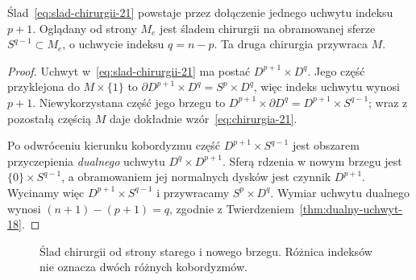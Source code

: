 \begin{twierdzenie}
\label{thm:odwrotna-chirurgia-21}
Ślad~\eqref{eq:slad-chirurgii-21} powstaje przez
dołączenie jednego uchwytu indeksu $p+1$.
Oglądany od strony $M_e$ jest śladem chirurgii
na obramowanej sferze $S^{q-1}\subset M_e$,
o uchwycie indeksu $q=n-p$.
Ta druga chirurgia przywraca $M$.
\end{twierdzenie}
\begin{proof}
Uchwyt w~\eqref{eq:slad-chirurgii-21} ma postać
$D^{p+1}\times D^q$. Jego część przyklejona do
$M\times\{1\}$ to $\partial D^{p+1}\times D^q
=S^p\times D^q$, więc indeks uchwytu wynosi $p+1$.
Niewykorzystana część jego brzegu to
$D^{p+1}\times\partial D^q=D^{p+1}\times S^{q-1}$;
wraz z pozostałą częścią $M$ daje dokładnie
wzór~\eqref{eq:chirurgia-21}.

Po odwróceniu kierunku kobordyzmu część
$D^{p+1}\times S^{q-1}$ jest obszarem
przyczepienia \emph{dualnego} uchwytu
$D^q\times D^{p+1}$. Sferą rdzenia w nowym
brzegu jest $\{0\}\times S^{q-1}$, a obramowaniem
jej normalnych dysków jest czynnik $D^{p+1}$.
Wycinamy więc $D^{p+1}\times S^{q-1}$
i przywracamy $S^p\times D^q$.
Wymiar uchwytu dualnego wynosi
$(n+1)-(p+1)=q$, zgodnie z
Twierdzeniem~\ref{thm:dualny-uchwyt-18}.
\end{proof}

\begin{figure}[htbp]
\centering
{}
\caption{Ślad chirurgii od strony starego i nowego brzegu.
Różnica indeksów nie oznacza dwóch różnych kobordyzmów.}
\label{fig:slad-chirurgii-21}
\end{figure}

